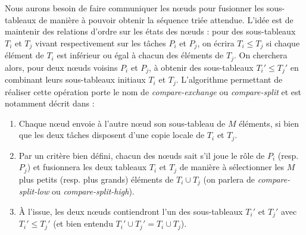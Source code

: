 Nous aurons besoin de faire communiquer les nœuds pour fusionner les sous-tableaux de manière à pouvoir obtenir la séquence triée attendue. L'idée est de maintenir des relations d'ordre sur les états des nœuds : pour des sous-tableaux $T_i$ et $T_j$ vivant respectivement sur les tâches $P_i$ et $P_j$, on écrira $T_i \leq T_j$ si chaque élément de $T_i$ est inférieur ou égal à chacun des éléments de $T_j$. On cherchera alors, pour deux nœuds voisins $P_i$ et $P_j$, à obtenir des sous-tableaux $T_i' \leq T_j'$ en combinant leurs sous-tableaux initiaux $T_i$ et $T_j$. L'algorithme permettant de réaliser cette opération porte le nom de \textit{compare-exchange} ou \textit{compare-split} et est notamment décrit dans \cite{GRAMA} :

\begin{enumerate}
\item Chaque nœud envoie à l'autre nœud son sous-tableau de $M$ éléments, si bien que les deux tâches disposent d'une copie locale de $T_i$ et $T_j$.
\item Par un critère bien défini, chacun des nœuds sait s'il joue le rôle de $P_i$ (resp. $P_j$) et fusionnera les deux tableaux $T_i$ et $T_j$ de manière à sélectionner les $M$ plus petits (resp. plus grands) éléments de $T_i \cup T_j$ (on parlera de \textit{compare-split-low} ou \textit{compare-split-high}).
\item À l'issue, les deux nœuds contiendront l'un des sous-tableaux $T_i'$ et $T_j'$ avec $T_i' \leq T_j'$ (et bien entendu $T_i' \cup T_j' = T_i \cup T_j$).
\end{enumerate}

